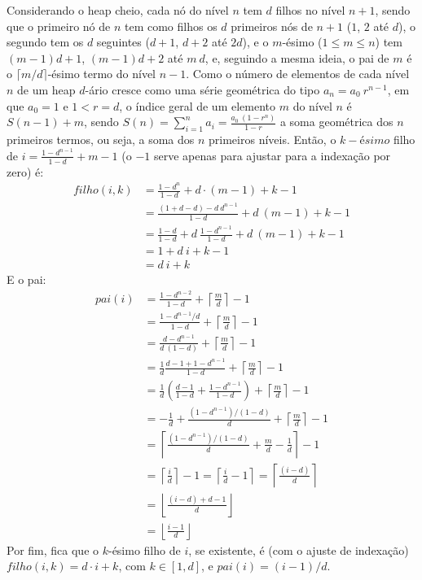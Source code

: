 Considerando o heap cheio, cada nó do nível $n$ tem $d$ filhos no nível $n+1$, sendo que o primeiro
nó de $n$ tem como filhos os $d$ primeiros nós de $n+1$ ($1$, $2$ até $d$), o segundo tem os $d$ seguintes
($d+1$, $d+2$ até $2d$), e o $m$-ésimo ($1 \leqslant m \leqslant n$) tem $(m-1)d+1$, $(m-1)d+2$ até $m\ d$,
e, seguindo a mesma ideia, o pai de $m$ é o $\lceil m/d \rceil$-ésimo termo do nível $n-1$.
Como o número de elementos de cada nível $n$ de um heap $d$-ário cresce como uma série geométrica do tipo
$a_n = a_0\ r^{n-1}$, em que $a_0 = 1$ e $1 < r = d$, o índice geral de um elemento $m$ do nível $n$ é $S(n-1)+m$,
sendo $S(n) = \sum_{i = 1}^{n} a_i = \frac{a_0\ (1-r^n)}{1-r}$ a soma geométrica dos $n$ primeiros termos, ou seja, a soma dos $n$
primeiros níveis. Então, o $k-ésimo$ filho de $i = \frac{1-d^{n-1}}{1-d} + m - 1$ (o $-1$ serve apenas para ajustar para a
indexação por zero) é:
\begin{align*}
    filho(i, k) &= \frac{1-d^n}{1-d} + d\cdot(m-1) + k - 1 \\
    &= \frac{(1+d-d)-d\ d^{n-1}}{1-d} + d\ (m-1) + k - 1 \\
    &= \frac{1-d}{1-d} + d\ \frac{1-d^{n-1}}{1-d} + d\ (m-1) + k - 1 \\
    &= 1 + d\ i + k - 1 \\
    &= d\ i + k
\end{align*}
E o pai:
\begin{align*}
    pai(i) &= \frac{1-d^{n-2}}{1-d} + \left\lceil\frac{m}{d}\right\rceil - 1 \\
    &= \frac{1-d^{n-1}/d}{1-d} + \left\lceil\frac{m}{d}\right\rceil - 1 \\
    &= \frac{d-d^{n-1}}{d\ (1-d)} + \left\lceil\frac{m}{d}\right\rceil - 1 \\
    &= \frac{1}{d}\frac{d-1+1-d^{n-1}}{1-d} + \left\lceil\frac{m}{d}\right\rceil - 1 \\
    &= \frac{1}{d}\left(\frac{d-1}{1-d}+\frac{1-d^{n-1}}{1-d}\right) + \left\lceil\frac{m}{d}\right\rceil - 1 \\
    &= -\frac{1}{d}+\frac{(1-d^{n-1})/(1-d)}{d} + \left\lceil\frac{m}{d}\right\rceil - 1 \\
    &= \left\lceil\frac{(1-d^{n-1})/(1-d)}{d} + \frac{m}{d} -\frac{1}{d}\right\rceil - 1 \\
    &= \left\lceil \frac{i}{d} \right\rceil - 1 = \left\lceil \frac{i}{d} - 1 \right\rceil = \left\lceil \frac{(i-d)}{d} \right\rceil \\
    &= \left\lfloor \frac{(i-d) + d - 1}{d} \right\rfloor \\
    &= \left\lfloor \frac{i - 1}{d} \right\rfloor
\end{align*}
Por fim, fica que o $k$-ésimo filho de $i$, se existente, é (com o ajuste de indexação) $filho(i, k) = d\cdot i+k$, com $k \in [1, d]$,
e $pai(i) = (i-1) / d$.
